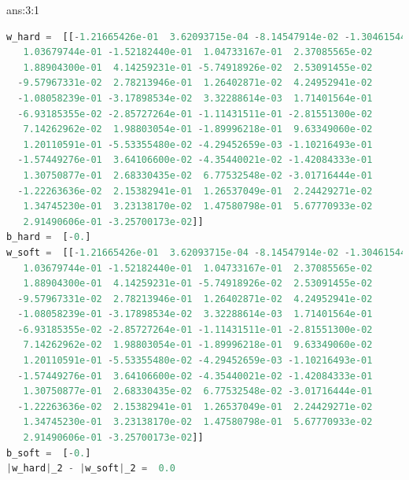 \documentclass{tron}
\begin{document}
\begin{answer}{ans:3:1}
\begin{lstlisting}[language=python, style=mystyle:output, label=output:p3:1]
w_hard =  [[-1.21665426e-01  3.62093715e-04 -8.14547914e-02 -1.30461544e-01
   1.03679744e-01 -1.52182440e-01  1.04733167e-01  2.37085565e-02
   1.88904300e-01  4.14259231e-01 -5.74918926e-02  2.53091455e-02
  -9.57967331e-02  2.78213946e-01  1.26402871e-02  4.24952941e-02
  -1.08058239e-01 -3.17898534e-02  3.32288614e-03  1.71401564e-01
  -6.93185355e-02 -2.85727264e-01 -1.11431511e-01 -2.81551300e-02
   7.14262962e-02  1.98803054e-01 -1.89996218e-01  9.63349060e-02
   1.20110591e-01 -5.53355480e-02 -4.29452659e-03 -1.10216493e-01
  -1.57449276e-01  3.64106600e-02 -4.35440021e-02 -1.42084333e-01
   1.30750877e-01  2.68330435e-02  6.77532548e-02 -3.01716444e-01
  -1.22263636e-02  2.15382941e-01  1.26537049e-01  2.24429271e-02
   1.34745230e-01  3.23138170e-02  1.47580798e-01  5.67770933e-02
   2.91490606e-01 -3.25700173e-02]]
b_hard =  [-0.]
w_soft =  [[-1.21665426e-01  3.62093715e-04 -8.14547914e-02 -1.30461544e-01
   1.03679744e-01 -1.52182440e-01  1.04733167e-01  2.37085565e-02
   1.88904300e-01  4.14259231e-01 -5.74918926e-02  2.53091455e-02
  -9.57967331e-02  2.78213946e-01  1.26402871e-02  4.24952941e-02
  -1.08058239e-01 -3.17898534e-02  3.32288614e-03  1.71401564e-01
  -6.93185355e-02 -2.85727264e-01 -1.11431511e-01 -2.81551300e-02
   7.14262962e-02  1.98803054e-01 -1.89996218e-01  9.63349060e-02
   1.20110591e-01 -5.53355480e-02 -4.29452659e-03 -1.10216493e-01
  -1.57449276e-01  3.64106600e-02 -4.35440021e-02 -1.42084333e-01
   1.30750877e-01  2.68330435e-02  6.77532548e-02 -3.01716444e-01
  -1.22263636e-02  2.15382941e-01  1.26537049e-01  2.24429271e-02
   1.34745230e-01  3.23138170e-02  1.47580798e-01  5.67770933e-02
   2.91490606e-01 -3.25700173e-02]]
b_soft =  [-0.]
|w_hard|_2 - |w_soft|_2 =  0.0
\end{lstlisting}
\end{answer}
\end{document}
